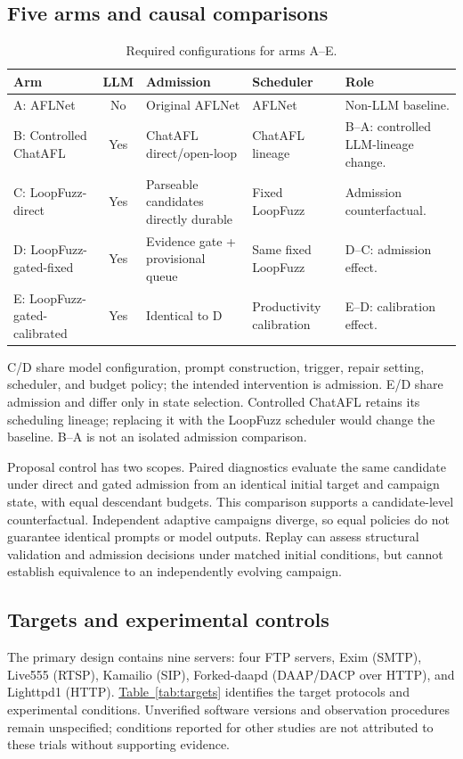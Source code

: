 \documentclass[final,5p,times,number]{elsarticle}
\newcommand{\namedref}[2]{\hyperref[#2]{#1~\ref*{#2}}}
\begin{document}
\subsection{Five arms and causal comparisons}
\begin{table}[!tbp]
\centering\small
\caption{Required configurations for arms A--E.}
\label{tab:arms}
\begin{tabularx}{\textwidth}{l c Y Y Y}
\toprule
Arm & LLM & Admission & Scheduler & Role \\
\midrule
A: AFLNet & No & Original AFLNet & AFLNet & Non-LLM baseline. \\
B: Controlled ChatAFL & Yes & ChatAFL direct/open-loop & ChatAFL lineage & B--A: controlled LLM-lineage change. \\
C: LoopFuzz-direct & Yes & Parseable candidates directly durable & Fixed LoopFuzz & Admission counterfactual. \\
D: LoopFuzz-gated-fixed & Yes & Evidence gate + provisional queue & Same fixed LoopFuzz & D--C: admission effect. \\
E: LoopFuzz-gated-calibrated & Yes & Identical to D & Productivity calibration & E--D: calibration effect. \\
\bottomrule
\end{tabularx}
\end{table}

C/D share model configuration, prompt construction, trigger, repair setting, scheduler, and budget policy; the intended intervention is admission. E/D share admission and differ only in state selection. Controlled ChatAFL retains its scheduling lineage; replacing it with the LoopFuzz scheduler would change the baseline. B--A is not an isolated admission comparison.

Proposal control has two scopes. Paired diagnostics evaluate the same candidate under direct and gated admission from an identical initial target and campaign state, with equal descendant budgets. This comparison supports a candidate-level counterfactual. Independent adaptive campaigns diverge, so equal policies do not guarantee identical prompts or model outputs. Replay can assess structural validation and admission decisions under matched initial conditions, but cannot establish equivalence to an independently evolving campaign.

\subsection{Targets and experimental controls}
The primary design contains nine servers: four FTP servers, Exim (SMTP), Live555 (RTSP), Kamailio (SIP), Forked-daapd (DAAP/DACP over HTTP), and Lighttpd1 (HTTP). \namedref{Table}{tab:targets} identifies the target protocols and experimental conditions. Unverified software versions and observation procedures remain unspecified; conditions reported for other studies are not attributed to these trials without supporting evidence.
\end{document}

